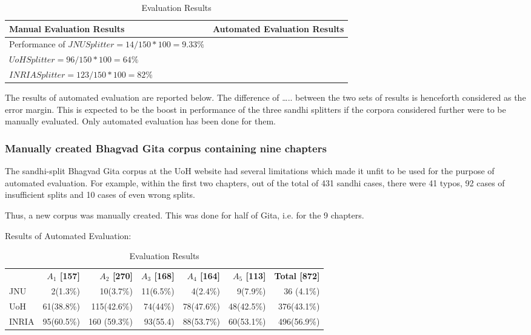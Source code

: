 \documentclass[11pt]{article}
\begin{document}
\begin{table}[h]
\begin{center}
\begin{tabular}{l l}
\hline \bf Manual Evaluation Results & \bf Automated Evaluation Results \\
\hline
Performance of 
$JNU Splitter = 14 /150 * 100 = 9.33 \%$  & \\
$UoH Splitter = 96/150 * 100 = 64 \%$  & \\
$INRIA Splitter = 123/150 * 100 = 82 \%$  & \\
\hline
\end{tabular}
\end{center}
\caption{\label{font-table} Evaluation Results }
\end{table}

The results of automated evaluation are reported below. The difference of ….. between the two sets of results is henceforth  considered as the error margin. This is expected to be the boost in performance of the three sandhi splitters if the corpora considered further were to be manually evaluated. Only automated evaluation has been done for them.

\subsubsection{Manually created Bhagvad Gita corpus containing nine chapters }

The sandhi-split Bhagvad Gita corpus at the UoH website had several limitations which made it unfit to be used for the purpose of automated evaluation. For example, within the first two chapters, out of the total of 431 sandhi cases, there were 41 typos, 92 cases of insufficient splits and 10 cases of even wrong splits.

Thus, a new corpus was manually created. This was done for half of Gita, i.e. for the 9 chapters.


Results of Automated Evaluation:

\begin{table}[h]
\begin{center}
\begin{tabular}{l r r r r r r}
\hline 
&  \bf  $A_1$ [157] & \bf  $A_2$ [270] & \bf $A_3$ [168] & \bf $A_4$ [164]  & \bf $A_5$ [113]  & \bf Total [872] \\
JNU & 2(1.3\%) & 10(3.7\%) & 11(6.5\%) & 4(2.4\%) & 9(7.9\%) & 36 (4.1\%) \\
UoH & 61(38.8\%) & 115(42.6\%) & 74(44\%) & 78(47.6\%) & 48(42.5\%) & 376(43.1\%)\\
INRIA & 95(60.5\%) & 160 (59.3\%) & 93(55.4) & 88(53.7\%) & 60(53.1\%) & 496(56.9\%)\\
\hline
\end{tabular}
\end{center}
\caption{\label{font-table} Evaluation Results }
\end{table}
\end{document}
